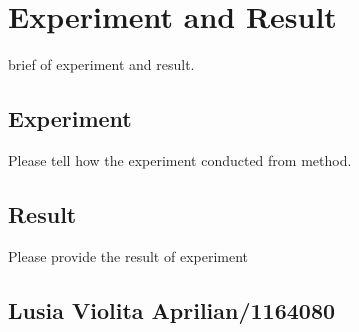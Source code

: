 \chapter{Experiment and Result}
brief of experiment and result.
\section{Experiment}
Please tell how the experiment conducted from method.

\section{Result}
Please provide the result of experiment

\section{Lusia Violita Aprilian/1164080}

